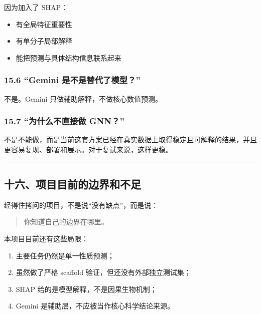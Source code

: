\documentclass[
  ,
]{ctexart}
\providecommand{\tightlist}{%
  \setlength{\itemsep}{0pt}\setlength{\parskip}{0pt}}
\begin{document}
因为加入了 SHAP：

\begin{itemize}
\tightlist
\item
  有全局特征重要性
\item
  有单分子局部解释
\item
  能把预测与具体结构信息联系起来
\end{itemize}

\hypertarget{gemini-ux662fux4e0dux662fux66ffux4ee3ux4e86ux6a21ux578b}{%
\subsubsection{15.6 ``Gemini
是不是替代了模型？''}\label{gemini-ux662fux4e0dux662fux66ffux4ee3ux4e86ux6a21ux578b}}

不是。Gemini 只做辅助解释，不做核心数值预测。

\hypertarget{ux4e3aux4ec0ux4e48ux4e0dux76f4ux63a5ux505a-gnn}{%
\subsubsection{15.7 ``为什么不直接做
GNN？''}\label{ux4e3aux4ec0ux4e48ux4e0dux76f4ux63a5ux505a-gnn}}

不是不能做，而是当前这套方案已经在真实数据上取得稳定且可解释的结果，并且更容易复现、部署和展示。对于复试来说，这样更稳。

\begin{center}\rule{0.5\linewidth}{0.5pt}\end{center}

\hypertarget{ux5341ux516dux9879ux76eeux76eeux524dux7684ux8fb9ux754cux548cux4e0dux8db3}{%
\subsection{十六、项目目前的边界和不足}\label{ux5341ux516dux9879ux76eeux76eeux524dux7684ux8fb9ux754cux548cux4e0dux8db3}}

经得住拷问的项目，不是说``没有缺点''，而是说：

\begin{quote}
你知道自己的边界在哪里。
\end{quote}

本项目目前还有这些局限：

\begin{enumerate}
\def\labelenumi{\arabic{enumi}.}
\tightlist
\item
  主要任务仍然是单一性质预测；
\item
  虽然做了严格 scaffold 验证，但还没有外部独立测试集；
\item
  SHAP 给的是模型解释，不是因果生物机制；
\item
  Gemini 是辅助层，不应被当作核心科学结论来源。
\end{enumerate}
\end{document}
